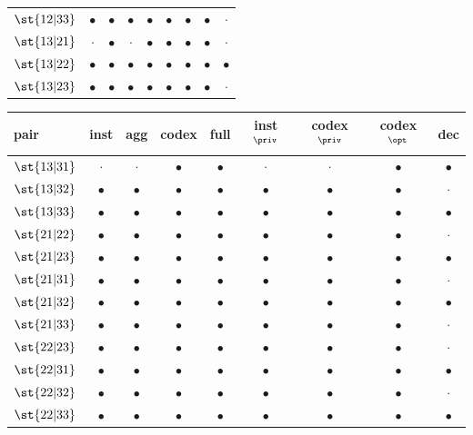\begin{table}[H]
\begin{tabular}{lcccccccc}
$\st{12|33}$ & $\bullet$ & $\bullet$ & $\bullet$ & $\bullet$ & $\bullet$ & $\bullet$ & $\bullet$ & $\cdot$ \\
$\st{13|21}$ & $\cdot$ & $\bullet$ & $\cdot$ & $\bullet$ & $\bullet$ & $\bullet$ & $\bullet$ & $\cdot$ \\
$\st{13|22}$ & $\bullet$ & $\bullet$ & $\bullet$ & $\bullet$ & $\bullet$ & $\bullet$ & $\bullet$ & $\bullet$ \\
$\st{13|23}$ & $\bullet$ & $\bullet$ & $\bullet$ & $\bullet$ & $\bullet$ & $\bullet$ & $\bullet$ & $\cdot$ \\
\bottomrule
\end{tabular}\quad
\begin{tabular}{lcccccccc}
\toprule
pair & inst & agg & codex & full & inst$^{\priv}$ & codex$^{\priv}$ & codex$^{\opt}$ & dec \\
\midrule
$\st{13|31}$ & $\cdot$ & $\cdot$ & $\bullet$ & $\bullet$ & $\cdot$ & $\cdot$ & $\bullet$ & $\bullet$ \\
$\st{13|32}$ & $\bullet$ & $\bullet$ & $\bullet$ & $\bullet$ & $\bullet$ & $\bullet$ & $\bullet$ & $\cdot$ \\
$\st{13|33}$ & $\bullet$ & $\bullet$ & $\bullet$ & $\bullet$ & $\bullet$ & $\bullet$ & $\bullet$ & $\bullet$ \\
$\st{21|22}$ & $\bullet$ & $\bullet$ & $\bullet$ & $\bullet$ & $\bullet$ & $\bullet$ & $\bullet$ & $\cdot$ \\
$\st{21|23}$ & $\bullet$ & $\bullet$ & $\bullet$ & $\bullet$ & $\bullet$ & $\bullet$ & $\bullet$ & $\bullet$ \\
$\st{21|31}$ & $\bullet$ & $\bullet$ & $\bullet$ & $\bullet$ & $\bullet$ & $\bullet$ & $\bullet$ & $\cdot$ \\
$\st{21|32}$ & $\bullet$ & $\bullet$ & $\bullet$ & $\bullet$ & $\bullet$ & $\bullet$ & $\bullet$ & $\bullet$ \\
$\st{21|33}$ & $\bullet$ & $\bullet$ & $\bullet$ & $\bullet$ & $\bullet$ & $\bullet$ & $\bullet$ & $\cdot$ \\
$\st{22|23}$ & $\bullet$ & $\bullet$ & $\bullet$ & $\bullet$ & $\bullet$ & $\bullet$ & $\bullet$ & $\cdot$ \\
$\st{22|31}$ & $\bullet$ & $\bullet$ & $\bullet$ & $\bullet$ & $\bullet$ & $\bullet$ & $\bullet$ & $\bullet$ \\
$\st{22|32}$ & $\bullet$ & $\bullet$ & $\bullet$ & $\bullet$ & $\bullet$ & $\bullet$ & $\bullet$ & $\cdot$ \\
$\st{22|33}$ & $\bullet$ & $\bullet$ & $\bullet$ & $\bullet$ & $\bullet$ & $\bullet$ & $\bullet$ & $\bullet$ \\

\end{tabular}
\end{table}

